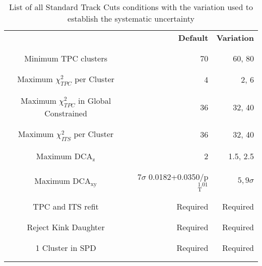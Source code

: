 \begin{table}[h]
\center
\begin{tabular}{c|r|r}
								&\textbf{Default}							&\textbf{Variation}		\\
								\\ \hline \\
Minimum TPC clusters 				&70										&60, 80\\
								\\ \hline \\
Maximum $\chi^2_{TPC}$ per Cluster	&4										&2, 6\\
								\\ \hline \\
Maximum $\chi^2_{TPC}$ in Global Constrained	&36								&32, 40\\
								\\ \hline \\
Maximum $\chi^2_{ITS}$ per Cluster		&36										&32, 40\\
								\\ \hline \\
Maximum DCA$_{\text{z}}$			&2										&1.5, 2.5\\
								\\ \hline \\
Maximum DCA$_{\text{xy}}$			&$7\sigma$ 0.0182+0.0350/p$_{\text{T}}^{1.01}$	&$5,9\sigma$\\
								\\ \hline \\
TPC and ITS refit					&Required								&Required\\
								\\ \hline \\
Reject Kink Daughter				&Required								&Required\\
								\\ \hline \\
1 Cluster in SPD					&Required								&Required\\
								\\ \hline \\

\end{tabular}
\caption{List of all Standard Track Cuts conditions with the variation used to establish the systematic uncertainty}
\label{tab:Syst_AC}
\end{table}

